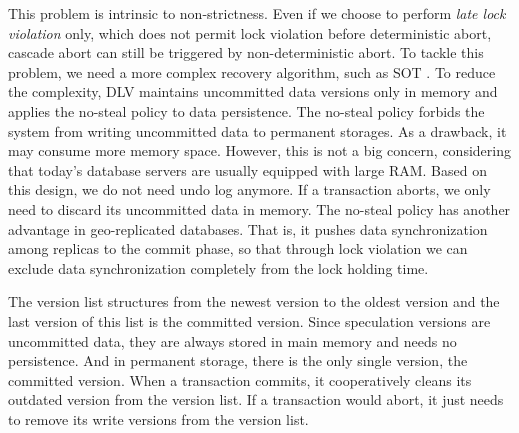 \documentclass[conference]{IEEEtran}
\begin{document}
This problem is intrinsic to   non-strictness.
Even if we choose to perform \emph{late lock violation} only, which does not permit lock violation before deterministic abort,
cascade abort can still be triggered by non-deterministic abort.
To tackle this problem, we need a more complex recovery algorithm, such as SOT \cite{UnifyCR:journals/is/AlonsoVABASW94}.
To reduce the complexity, DLV maintains uncommitted data versions only in memory and applies the no-steal policy to data persistence.
The no-steal policy forbids the system from writing uncommitted data to permanent storages.
As a drawback, it may consume more memory space.
However, this is not a big concern, considering that today's database servers are usually equipped with large RAM.
Based on this design, we do not need undo log anymore. If a transaction aborts, we only need to discard its uncommitted data in memory.
The no-steal policy has another advantage in geo-replicated databases. That is, it pushes data synchronization among replicas to the commit phase,
so that through lock violation we can exclude data synchronization completely from the lock holding time. %

The version list structures from the newest version to the oldest version and the last version of this list is the committed version.
Since speculation versions are uncommitted data, they are always stored in main memory and needs no persistence.
And in permanent storage, there is the only single version, the committed version.
When a transaction commits, it cooperatively cleans its outdated version from the version list. 
If a transaction would abort, it just needs to remove its write versions from the version list.
\end{document}
